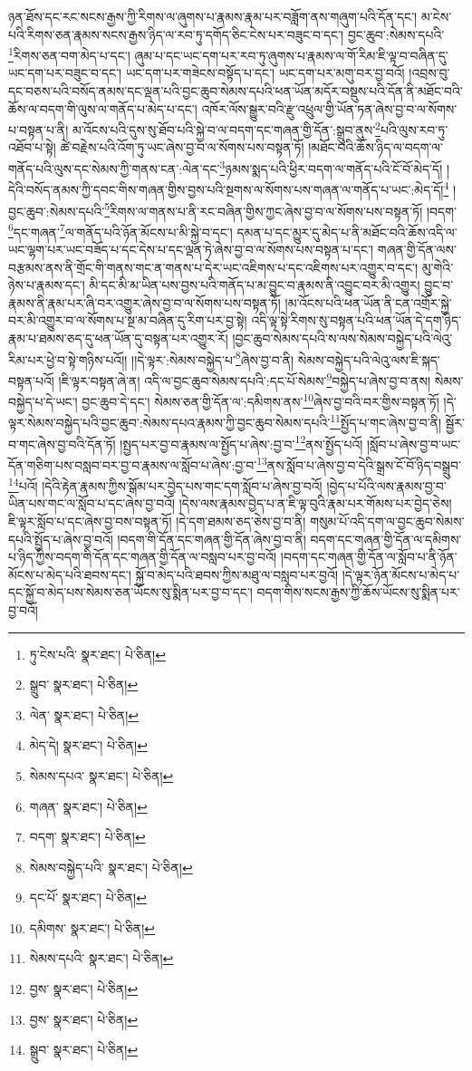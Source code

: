 ཉན་ཐོས་དང་རང་སངས་རྒྱས་ཀྱི་རིགས་ལ་ཞུགས་པ་རྣམས་རྣམ་པར་བཟློག་ནས་གཞུག་པའི་དོན་དང་། མ་ངེས་པའི་རིགས་ཅན་རྣམས་སངས་རྒྱས་ཉིད་ལ་རབ་ཏུ་དགོད་ཅིང་ངེས་པར་བཟུང་བ་དང་། བྱང་ཆུབ་:སེམས་དཔའི་\footnote{ཏུ་ངེས་པའི་  སྣར་ཐང་།  པེ་ཅིན། }རིགས་ཅན་བག་མེད་པ་དང་། ཞུམ་པ་དང་ཡང་དག་པར་རབ་ཏུ་ཞུགས་པ་རྣམས་ལ་གོ་རིམ་ཇི་ལྟ་བ་བཞིན་དུ་ཡང་དག་པར་བཟུང་བ་དང་། ཡང་དག་པར་གཟེངས་བསྟོད་པ་དང་། ཡང་དག་པར་མགུ་བར་བྱ་བའོ། །འབྲས་བུ་དང་བཅས་པའི་བསོད་ནམས་དང་ལྡན་པའི་བྱང་ཆུབ་སེམས་དཔའི་ཕན་ཡོན་མདོར་བསྡུས་པའི་དོན་ནི་མཐོང་བའི་ཆོས་ལ་བདག་གི་ལུས་ལ་གནོད་པ་མེད་པ་དང་། འཁོར་ལོས་སྒྱུར་བའི་རྫུ་འཕྲུལ་གྱི་ཡོན་ཏན་ཞེས་བྱ་བ་ལ་སོགས་པ་བསྟན་པ་ནི། མ་འོངས་པའི་དུས་སུ་ཐོབ་པའི་སྐྱེ་བ་ལ་བདག་དང་གཞན་གྱི་དོན་:སྒྲུབ་ནུས་\footnote{སྒྲུབ་  སྣར་ཐང་།  པེ་ཅིན། }པའི་ལུས་རབ་ཏུ་འཐོབ་པ་སྟེ། ཚེ་བརྗེས་པའི་འོག་ཏུ་ཡང་ཞེས་བྱ་བ་ལ་སོགས་པས་བསྟན་ཏོ། །མཐོང་བའི་ཆོས་ཉིད་ལ་བདག་ལ་གནོད་པའི་ལུས་དང་སེམས་ཀྱི་གནས་ངན་:ལེན་དང་\footnote{ལེན་  སྣར་ཐང་།  པེ་ཅིན། }ཉམས་སྨད་པའི་ཕྱིར་བདག་ལ་གནོད་པའི་ངོ་བོ་མེད་དོ། །དེའི་བསོད་ནམས་ཀྱི་དབང་གིས་གཞན་གྱིས་བྱས་པའི་སྔགས་ལ་སོགས་པས་གཞན་ལ་གནོད་པ་ཡང་:མེད་དོ།\footnote{མེད་དེ།  སྣར་ཐང་།  པེ་ཅིན། } །བྱང་ཆུབ་:སེམས་དཔའི་\footnote{སེམས་དཔའ་  སྣར་ཐང་།  པེ་ཅིན། }རིགས་ལ་གནས་པ་ནི་རང་བཞིན་གྱིས་ཀྱང་ཞེས་བྱ་བ་ལ་སོགས་པས་བསྟན་ཏོ། །བདག་\footnote{གཞན་  སྣར་ཐང་།  པེ་ཅིན། }དང་གཞན་\footnote{བདག་  སྣར་ཐང་།  པེ་ཅིན། }ལ་གནོད་པའི་ཉོན་མོངས་པ་མི་སྐྱེ་བ་དང་། དམན་པ་དང་མྱུར་དུ་མེད་པ་ནི་མཐོང་བའི་ཆོས་འདི་ལ་ཡང་ལྷག་པར་ཡང་བཟོད་པ་དང་དེས་པ་དང་ལྡན་ཏེ་ཞེས་བྱ་བ་ལ་སོགས་པས་བསྟན་པ་དང་། གཞན་གྱི་དོན་ལས་བརྩམས་ནས་ནི་གྲོང་གི་གནས་གང་ན་གནས་པ་དེར་ཡང་འཇིགས་པ་དང་འཇིགས་པར་འགྱུར་བ་དང་། མུ་གེའི་ཉེས་པ་རྣམས་དང་། མི་དང་མི་མ་ཡིན་པས་བྱས་པའི་གནོད་པ་མ་བྱུང་བ་རྣམས་ནི་འབྱུང་བར་མི་འགྱུར། བྱུང་བ་རྣམས་ནི་རྣམ་པར་ཞི་བར་འགྱུར་ཞེས་བྱ་བ་ལ་སོགས་པས་བསྟན་ཏོ། །མ་འོངས་པའི་ཕན་ཡོན་ནི་ངན་འགྲོར་སྐྱེ་བར་མི་འགྱུར་བ་ལ་སོགས་པ་སྔ་མ་བཞིན་དུ་རིག་པར་བྱ་སྟེ། འདི་ལྟ་སྟེ་རིགས་སུ་བསྟན་པའི་ཕན་ཡོན་དེ་དག་ཉིད་རྣམ་པ་ཐམས་ཅད་དུ་ཕན་ཡོན་དུ་བསྟན་པར་འགྱུར་རོ། །བྱང་ཆུབ་སེམས་དཔའི་ས་ལས་སེམས་བསྐྱེད་པའི་ལེའུ་རིམ་པར་ཕྱེ་བ་སྟེ་གཉིས་པའོ།། །།དེ་ལྟར་:སེམས་བསྐྱེད་པ་\footnote{སེམས་བསྐྱེད་པའི་  སྣར་ཐང་།  པེ་ཅིན། }ཞེས་བྱ་བ་ནི། སེམས་བསྐྱེད་པའི་ལེའུ་ལས་ཇི་སྐད་བསྟན་པའོ། །ཇི་ལྟར་བསྟན་ཞེ་ན། འདི་ལ་བྱང་ཆུབ་སེམས་དཔའི་:དང་པོ་སེམས་\footnote{དང་པོ་  སྣར་ཐང་།  པེ་ཅིན། }བསྐྱེད་པ་ཞེས་བྱ་བ་ནས། སེམས་བསྐྱེད་པ་དེ་ཡང་། བྱང་ཆུབ་དེ་དང་། སེམས་ཅན་གྱི་དོན་ལ་:དམིགས་ནས་\footnote{དམིགས་  སྣར་ཐང་།  པེ་ཅིན། }ཞེས་བྱ་བའི་བར་གྱིས་བསྟན་ཏོ། །དེ་ལྟར་སེམས་བསྐྱེད་པའི་བྱང་ཆུབ་:སེམས་དཔའ་རྣམས་ཀྱི་བྱང་ཆུབ་སེམས་དཔའི་\footnote{སེམས་དཔའི་  སྣར་ཐང་།  པེ་ཅིན། }སྤྱོད་པ་གང་ཞེས་བྱ་བ་ནི། སྦྱོར་བ་གང་ཞེས་བྱ་བའི་དོན་ཏོ། །སྤྱད་པར་བྱ་བ་རྣམས་ལ་སྤྱོད་པ་ཞེས་:བྱ་བ་\footnote{བྱས་  སྣར་ཐང་།  པེ་ཅིན། }ནས་སྤྱོད་པའོ། །སློབ་པ་ཞེས་བྱ་བ་ཡང་དོན་གཅིག་པས་བསླབ་བར་བྱ་བ་རྣམས་ལ་སློབ་པ་ཞེས་:བྱ་བ་\footnote{བྱས་  སྣར་ཐང་།  པེ་ཅིན། }ནས་སློབ་པ་ཞེས་བྱ་བ་དེའི་སྒྲས་ངོ་བོ་ཉིད་བསྒྲུབ་\footnote{སྒྲུབ་  སྣར་ཐང་།  པེ་ཅིན། }པའོ། །དེའི་རྟེན་རྣམས་ཀྱིས་སྒོམ་པར་བྱེད་པས་གང་དག་སློབ་པ་ཞེས་བྱ་བའོ། །བྱེད་པ་པོའི་ལས་རྣམས་བྱ་བ་ཡིན་པས་གང་ལ་སློབ་པ་དང་ཞེས་བྱ་བའོ། །དེས་ལས་རྣམས་བྱེད་པ་ན་ཇི་ལྟ་བུའི་རྣམ་པར་གོམས་པར་བྱེད་ཅེས། ཇི་ལྟར་སློབ་པ་དང་ཞེས་བྱ་བས་བསྟན་ཏོ། །དེ་དག་ཐམས་ཅད་ཅེས་བྱ་བ་ནི། གསུམ་པོ་འདི་དག་ལ་བྱང་ཆུབ་སེམས་དཔའི་སྤྱོད་པ་ཞེས་བྱ་བའོ། །བདག་གི་དོན་དང་གཞན་གྱི་དོན་ཞེས་བྱ་བ་ནི། བདག་དང་གཞན་གྱི་དོན་ལ་དམིགས་པ་ཉིད་ཀྱིས་བདག་གི་དོན་དང་གཞན་གྱི་དོན་ལ་བསླབ་པར་བྱ་བའོ། །བདག་དང་གཞན་གྱི་དོན་ལ་སློབ་པ་ནི་ཉོན་མོངས་པ་མེད་པའི་ཐབས་དང་། སྐྱོ་བ་མེད་པའི་ཐབས་ཀྱིས་མཐུ་ལ་བསླབ་པར་བྱའོ། །དེ་ལྟར་ཉོན་མོངས་པ་མེད་པ་དང་སྐྱོ་བ་མེད་པས་སེམས་ཅན་ཡོངས་སུ་སྨིན་པར་བྱ་བ་དང་། བདག་གིས་སངས་རྒྱས་ཀྱི་ཆོས་ཡོངས་སུ་སྨིན་པར་བྱ་བའོ། 